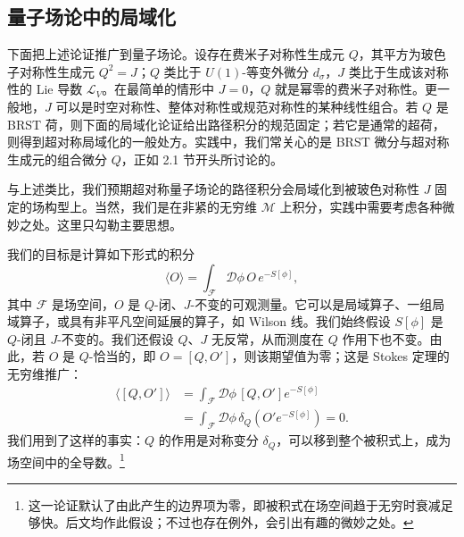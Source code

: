 \subsection{量子场论中的局域化}

下面把上述论证推广到量子场论。设存在费米子对称性生成元 $Q$，其平方为玻色子对称性生成元 $Q^2=J$；$Q$ 类比于 $U(1)$-等变外微分 $d_\sigma$，$J$ 类比于生成该对称性的 Lie 导数 $\mathcal{L}_V$。在最简单的情形中 $J=0$，$Q$ 就是幂零的费米子对称性。更一般地，$J$ 可以是时空对称性、整体对称性或规范对称性的某种线性组合。若 $Q$ 是 BRST 荷，则下面的局域化论证给出路径积分的规范固定；若它是通常的超荷，则得到超对称局域化的一般处方。实践中，我们常关心的是 BRST 微分与超对称生成元的组合微分 $Q$，正如 2.1 节开头所讨论的。

与上述类比，我们预期超对称量子场论的路径积分会局域化到被玻色对称性 $J$ 固定的场构型上。当然，我们是在非紧的无穷维 $\mathcal{M}$ 上积分，实践中需要考虑各种微妙之处。这里只勾勒主要思想。

我们的目标是计算如下形式的积分
\begin{equation}\tag{A.5}
\langle O\rangle = \int_{\mathcal{F}}\mathcal{D}\phi\, O\, e^{-S[\phi]},
\end{equation}
其中 $\mathcal{F}$ 是场空间，$O$ 是 $Q$-闭、$J$-不变的可观测量。它可以是局域算子、一组局域算子，或具有非平凡空间延展的算子，如 Wilson 线。我们始终假设 $S[\phi]$ 是 $Q$-闭且 $J$-不变的。我们还假设 $Q$、$J$ 无反常，从而测度在 $Q$ 作用下也不变。由此，若 $O$ 是 $Q$-恰当的，即 $O=[Q,O']$，则该期望值为零；这是
Stokes 定理的无穷维推广：
\begin{align}
\langle[Q,O']\rangle &= \int_{\mathcal{F}}\mathcal{D}\phi\,[Q,O']e^{-S[\phi]} \tag{A.6}\\
&= \int_{\mathcal{F}}\mathcal{D}\phi\,\delta_Q\left(O'e^{-S[\phi]}\right) = 0. \tag{A.7}
\end{align}
我们用到了这样的事实：$Q$ 的作用是对称变分 $\delta_Q$，可以移到整个被积式上，成为场空间中的全导数。\footnote{这一论证默认了由此产生的边界项为零，即被积式在场空间趋于无穷时衰减足够快。后文均作此假设；不过也存在例外，会引出有趣的微妙之处。}

